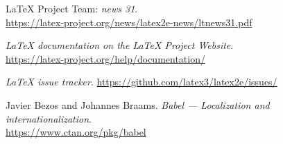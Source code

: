 \documentclass{ltnews}
\begin{document}
\begin{thebibliography}{9}

\fontsize{9.3}{11.3}\selectfont

 \LaTeX{} Project Team:
  \emph{\LaTeXe{} news 31}.\\
  \url{https://latex-project.org/news/latex2e-news/ltnews31.pdf}

  \emph{\LaTeX{} documentation on the \LaTeX{} Project Website}.\\
  \url{https://latex-project.org/help/documentation/}

  \emph{\LaTeX{} issue tracker}.
  \url{https://github.com/latex3/latex2e/issues/}

  Javier Bezos and Johannes Braams.
  \emph{Babel --- Localization and internationalization}.\\
  \url{https://www.ctan.org/pkg/babel}

\end{thebibliography}
\end{document}
